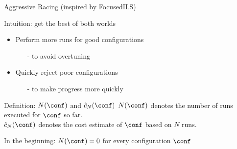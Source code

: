 \begin{frame}[c,fragile]{Aggressive Racing (inspired by FocusedILS) }

{Intuition: get the best of both worlds}

\begin{itemize}
	\item Perform more runs for good configurations
	\begin{itemize}
		\item[-] to avoid overtuning
	\end{itemize}
	\item Quickly reject poor configurations
	\begin{itemize}
		\item[-] to make progress more quickly
	\end{itemize}
\end{itemize}

\pause
\medskip

\begin{block}{Definition: $N(\conf)$ and $\hat{c}_N(\conf)$}
\alert{$N(\conf)$} denotes the number of runs executed for $\conf$ so far.\\
\alert{$\hat{c}_N(\conf)$} denotes the cost estimate of $\conf$ based on $N$ runs.
\end{block}

\pause
In the beginning: $N(\conf)=0$ for every configuration $\conf$

\end{frame}




